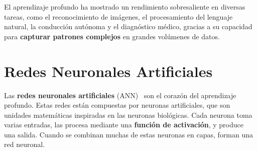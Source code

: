 El aprendizaje profundo ha mostrado un rendimiento sobresaliente en diversas tareas, como el reconocimiento de
imágenes, el procesamiento del lenguaje natural, la conducción autónoma y el diagnóstico médico, gracias a su capacidad
para \textbf{capturar patrones complejos} en grandes volúmenes de datos.

\section{Redes Neuronales Artificiales}\label{sec:redes-neuronales-artificiales}
Las \textbf{redes neuronales artificiales} (ANN)~\cite{sydenhamHandbookMeasuringSystem2005} son el corazón del aprendizaje profundo.
Estas redes están compuestas por neuronas artificiales, que son unidades matemáticas inspiradas en las neuronas
biológicas.
Cada neurona toma varias entradas, las procesa mediante una \textbf{función de activación}, y produce una salida.
Cuando se combinan muchas de estas neuronas en capas, forman una red neuronal.

